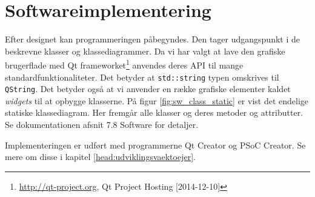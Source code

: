 \section{Softwareimplementering}\label{head:sw_impl}
Efter designet kan programmeringen påbegyndes. Den tager udgangspunkt i de beskrevne klasser og klassediagrammer.
Da vi har valgt at lave den grafiske brugerflade med Qt frameworket\footnote{\url{http://qt-project.org}, Qt Project Hosting [2014-12-10]} anvendes deres API til mange standardfunktionaliteter. Det betyder at \verb+std::string+ typen omskrives til \verb+QString+. 
Det betyder også at vi anvender en række grafiske elementer kaldet \textit{widgets} til at opbygge klasserne. På figur \ref{fig:sw_class_static} er vist det endelige statiske klassediagram. Her fremgår alle klasser og deres metoder og attributter.
Se dokumentationen afsnit 7.8 Software for detaljer.


Implementeringen er udført med programmerne Qt Creator og PSoC Creator. Se mere om disse i kapitel \ref{head:udviklingsvaektoejer}.

